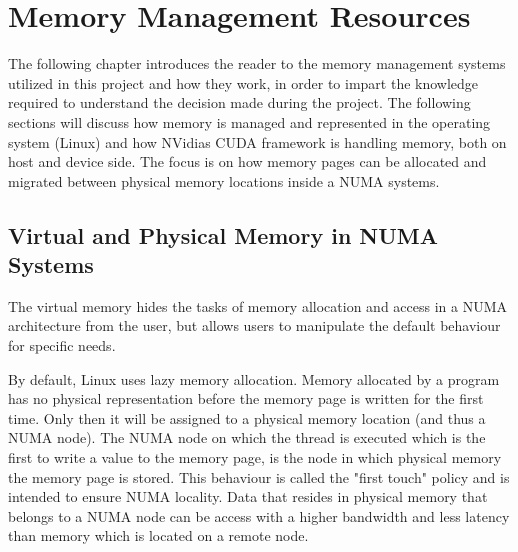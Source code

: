 \chapter{Memory Management Resources}\label{c:env}
The following chapter introduces the reader to the memory management systems
utilized in this project and how they work, in order to impart the knowledge required
to understand the decision made during the project. The following sections will 
discuss how memory is managed and represented in the operating system (Linux) and how NVidias CUDA framework is handling memory, both on host and device side. The focus is on
how memory pages can be allocated and migrated between physical memory locations inside a NUMA systems.

\section{Virtual and Physical Memory in NUMA Systems}\label{sec:vpm}
The virtual memory hides the tasks of memory allocation and access in a NUMA architecture from the user, but allows
users to manipulate the default behaviour for specific needs. 

By default, Linux uses lazy memory allocation. Memory allocated by a program has no physical representation before the memory page is written for the first time. Only then it will be assigned to a physical memory location (and thus a NUMA node). 
The NUMA node on which the thread is executed
which is the first to write a value to the memory page, is the node in which physical
memory the memory page is stored. This behaviour is called the "first touch" policy and
is intended to ensure NUMA locality.
Data that resides in physical memory that belongs
to a NUMA node can be access with a higher bandwidth and less latency than memory which is 
located on a remote node.

